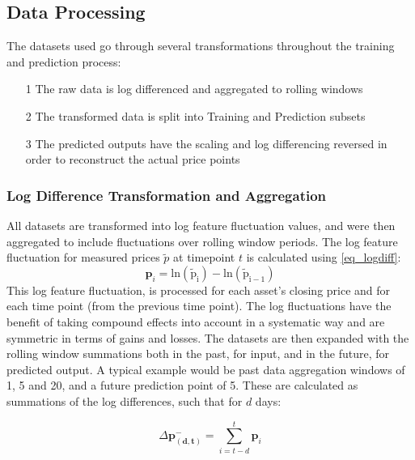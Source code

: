 \documentclass[a4paper,11pt,oneside]{article}
\theoremstyle{plain}
\theoremstyle{definition}
\begin{document}
	\subsection{Data Processing}\label{data_processing}
	
	The datasets used go through several transformations throughout the training and prediction process:
	
	\begin{itemize}
		\item [1] The raw data is log differenced and aggregated to rolling windows
		\item [2] The transformed data is split into Training and Prediction subsets
		\item [3] The predicted outputs have the scaling and log differencing reversed in order to reconstruct the actual price points
	\end{itemize}
	
	\subsubsection{Log Difference Transformation and Aggregation}\label{ldata_og_difference}
	All datasets are transformed into log feature fluctuation values, and were then aggregated to include fluctuations over rolling window periods. The log feature fluctuation for measured prices $\tilde{p}$ at timepoint $t$ is calculated using \eqref{eq_logdiff}:
	\begin{equation}\label{eq_logdiff}
	\mathbf{p}_i = \mathrm{ln(\tilde{p}_i) - \mathrm{ln}(\tilde{p}_{i-1})}
	\end{equation}
	This log feature fluctuation,  is processed for each asset's closing price and for each time point (from the previous time point). The log fluctuations have the benefit of taking compound effects into account in a systematic way and are symmetric in terms of gains and losses.
	\newline\newline
	The datasets are then expanded with the rolling window summations both in the past, for input, and in the future, for predicted output. A typical example would be past data aggregation windows of 1, 5 and 20, and a future prediction point of 5. These are calculated as summations of the log differences, such that for $d$ days:
	
	\begin{equation}
	\Delta \mathbf{p^{-}_{(d,t)}} = \sum_{i = t-d}^{t} \mathbf{p}_i
	\end{equation}
	
\end{document}
